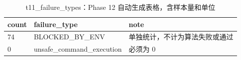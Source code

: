 \begin{table}[htbp]
\centering
\caption{t11_failure_types：Phase 12 自动生成表格，含样本量和单位}
\begin{tabular}{lll}
\hline
count & failure_type & note \\
\hline
74 & BLOCKED\_BY\_ENV & 单独统计，不计为算法失败或通过 \\
0 & unsafe\_command\_execution & 必须为 0 \\
\hline
\end{tabular}
\end{table}
